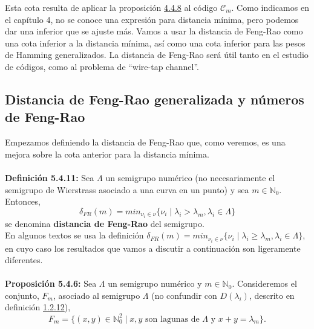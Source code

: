 \documentclass[11pt,spanish]{book}
\begin{document}
Esta cota resulta de aplicar la proposición \hyperlink{prop4.4.8}{4.4.8} al código $\mathcal{C}_m$. Como indicamos en el capítulo 4, no se conoce una expresión para distancia mínima, pero podemos dar una inferior que se ajuste más. Vamos a usar la distancia de Feng-Rao como una cota inferior a la distancia mínima, así como una cota inferior para las pesos de Hamming generalizados. La distancia de Feng-Rao será útil tanto en el estudio de códigos, como al problema de ``wire-tap channel''.
\subsection*{Distancia de Feng-Rao generalizada y números de Feng-Rao}
Empezamos definiendo la distancia de Feng-Rao que, como veremos, es una mejora sobre la cota anterior para la distancia mínima.\\
\\ \hypertarget{def5.4.11}{\textbf{Definición 5.4.11:}} Sea $\Lambda$ un semigrupo numérico (no necesariamente el semigrupo de Wierstrass asociado a una curva en un punto) y sea $m\in\mathbb{N}_0$. Entonces, 
$$\delta_{FR}(m) = min_{\nu_i\in \nu}\{\nu_i\;|\; \lambda_i > \lambda_m, \lambda_i\in \Lambda\}$$
se denomina \textbf{distancia de Feng-Rao} del semigrupo. \\

En algunos textos se usa la definición $\delta_{FR}(m) = min_{\nu_i\in \nu}\{\nu_i\;|\; \lambda_i \geq \lambda_m, \lambda_i\in \Lambda\}$, en cuyo caso los resultados que vamos a discutir a continuación son ligeramente diferentes.\\
\\\hypertarget{prop5.4.6}{\textbf{Proposición 5.4.6:}} Sea $\Lambda$ un semigrupo numérico y $m\in\mathbb{N}_0$. Consideremos el conjunto, $F_m$, asociado al semigrupo $\Lambda$ (no confundir con $D(\lambda_i)$, descrito en definición \hyperlink{def5.2.5}{1.2.12}),
$$F_m=\{(x,y)\in \mathbb{N}_0^2\;|\;x,y\text{ son lagunas de } \Lambda \text{ y } x+y=\lambda_m\}.$$
\end{document}
